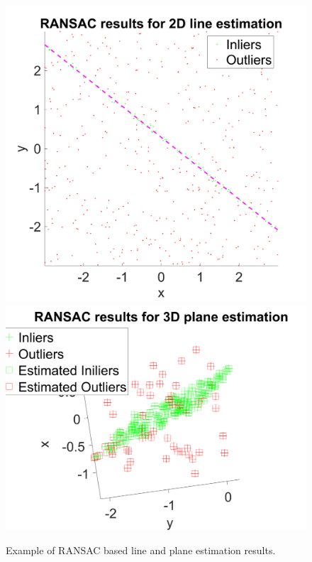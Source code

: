 \documentclass[a4paper]{article}
\begin{document}
\begin{figure}[!b]
\centering
\includegraphics[scale=0.4]{figures/ransac_line.png}
\includegraphics[scale=0.4]{figures/ransac_plane.png}
\caption{Example of RANSAC based line and plane estimation results.}
\end{figure}
\end{document}
